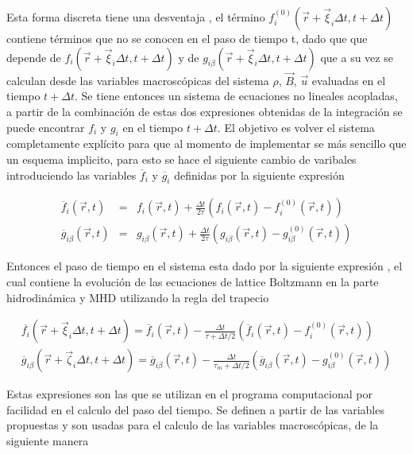 \noindent Esta forma discreta tiene una desventaja , el término $f_{i}^{(0)}(\vec{r}+\vec{\xi}_{i}\Delta t,t+\Delta t)$ contiene términos que no se conocen en el paso de tiempo t, dado que que depende de $f_{i}(\vec{r}+\vec{\xi}_{i}\Delta t,t+\Delta t)$ y de $g_{i\beta}(\vec{r}+\vec{\xi}_{i}\Delta t,t+\Delta t)$ que a su vez se calculan desde las variables macroscópicas del sistema $\rho$, $\vec{B}$, $\vec{u}$ evaluadas en el tiempo $t+\Delta t$. Se tiene entonces un sistema de ecuaciones no lineales acopladas, a partir de la combinación de estas dos expresiones obtenidas de la integración se puede encontrar $f_{i}$ y $g_{i}$ en el tiempo $t+\Delta t$. El objetivo es volver el sistema completamente explícito para que al momento de implementar se más sencillo que un esquema implicito, para esto se hace el siguiente cambio de varibales introduciendo las variables $\overline{f}_{i}$ y $\overline{g}_{i}$ definidas por la siguiente expresión 

\begin{eqnarray}
    \overline{f}_{i}(\vec{r},t) &=& f_{i}(\vec{r},t) + \frac{\Delta t}{2\tau}\left(f_{i}(\vec{r},t)-f_{i}^{(0)}(\vec{r},t)\right) \\
    \overline{g}_{i\beta}(\vec{r},t) &=& g_{i\beta}(\vec{r},t) + \frac{\Delta t}{2\tau}\left(g_{i\beta}(\vec{r},t)-g_{i\beta}^{(0)}(\vec{r},t)\right)
\end{eqnarray}


\noindent Entonces el paso de tiempo en el sistema esta dado por la siguiente expresión , el cual contiene la evolución de las ecuaciones de lattice Boltzmann en la parte hidrodinámica y MHD utilizando la regla del trapecio

\begin{eqnarray}
    \overline{f_{i}}(\vec{r}+\vec{\xi}_{i}\Delta t,t+\Delta t) = \overline{f}_{i}(\vec{r},t) - \frac{\Delta t}{\tau+\Delta t/2}\left(\overline{f}_{i}(\vec{r},t)-f_{i}^{(0)}(\vec{r},t)\right)\\
    \overline{g}_{i\beta}(\vec{r}+\vec{\zeta}_{i}\Delta t,t+\Delta t) = \overline{g}_{i\beta}(\vec{r},t) - \frac{\Delta t}{\tau_{m}+\Delta t/2}\left(\overline{g}_{i\beta}(\vec{r},t)-g_{i\beta}^{(0)}(\vec{r},t)\right)
\end{eqnarray}

\noindent Estas expresiones son las que se utilizan en el programa computacional por facilidad en el calculo del paso del tiempo. Se definen a partir de las variables propuestas y son usadas para el calculo de las variables macroscópicas, de la siguiente manera

